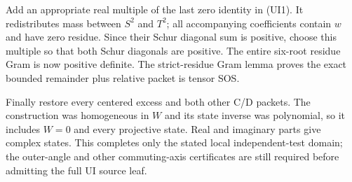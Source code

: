 Add an appropriate real multiple of the last zero identity in (UI1).
It redistributes mass between $S^2$ and $T^2$; all accompanying
coefficients contain $w$ and have zero residue. Since their Schur
diagonal sum is positive, choose this multiple so that both Schur
diagonals are positive. The entire six-root residue Gram is now
positive definite. The strict-residue Gram lemma proves the exact
bounded remainder plus relative packet is tensor SOS.

Finally restore every centered excess and both other C/D packets.
The construction was homogeneous in $W$ and its state inverse was
polynomial, so it includes $W=0$ and every projective state. Real and
imaginary parts give complex states. This completes only the stated
local independent-test domain; the outer-angle and other commuting-axis
certificates are still required before admitting the full UI source leaf.
